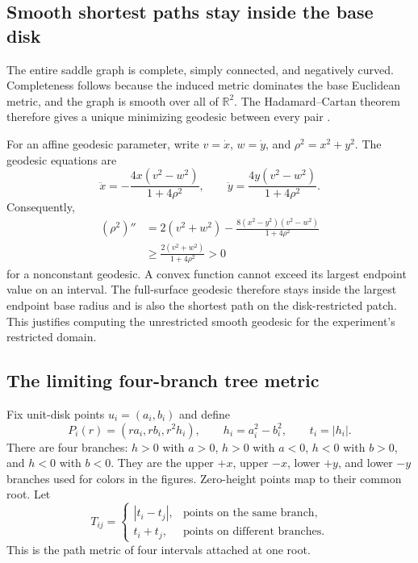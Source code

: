 \documentclass[11pt]{article}
\theoremstyle{remark}\newtheorem{remark}[proposition]{Remark}
\newcommand{\R}{\mathbb R}
\begin{document}
\subsection{Smooth shortest paths stay inside the base disk}
The entire saddle graph is complete, simply connected, and negatively curved.
Completeness follows because the induced metric dominates the base Euclidean
metric, and the graph is smooth over all of $\R^2$. The Hadamard--Cartan theorem
therefore gives a unique minimizing geodesic between every pair
\citep[Theorem 6.5.2, Corollary 6.5.3, and proof of Lemma 6.5.4,
pp.~124--125]{gorodski2022}.

For an affine geodesic parameter, write $v=\dot x$, $w=\dot y$, and
$\rho^2=x^2+y^2$. The geodesic equations are
\begin{equation}\label{eq:saddle-ode}
 \ddot x=-\frac{4x(v^2-w^2)}{1+4\rho^2},\qquad
 \ddot y=\frac{4y(v^2-w^2)}{1+4\rho^2}.
\end{equation}
Consequently,
\begin{align}
 (\rho^2)''
 &=2(v^2+w^2)-\frac{8(x^2-y^2)(v^2-w^2)}{1+4\rho^2}\\
 &\ge\frac{2(v^2+w^2)}{1+4\rho^2}>0
\end{align}
for a nonconstant geodesic. A convex function cannot exceed its largest
endpoint value on an interval. The full-surface geodesic therefore stays
inside the largest endpoint base radius and is also the shortest path on the
disk-restricted patch. This justifies computing the unrestricted smooth
geodesic for the experiment's restricted domain.

\subsection{The limiting four-branch tree metric}
Fix unit-disk points $u_i=(a_i,b_i)$ and define
\begin{equation}
 P_i(r)=(ra_i,rb_i,r^2h_i),\qquad h_i=a_i^2-b_i^2,\qquad t_i=|h_i|.
\end{equation}
There are four branches: $h>0$ with $a>0$, $h>0$ with $a<0$, $h<0$ with
$b>0$, and $h<0$ with $b<0$. They are the upper $+x$, upper $-x$, lower $+y$,
and lower $-y$ branches used for colors in the figures. Zero-height points
map to their common root. Let
\begin{equation}\label{eq:tree}
 T_{ij}=\begin{cases}
 |t_i-t_j|,&\text{points on the same branch},\\
 t_i+t_j,&\text{points on different branches}.
 \end{cases}
\end{equation}
This is the path metric of four intervals attached at one root.
\end{document}
